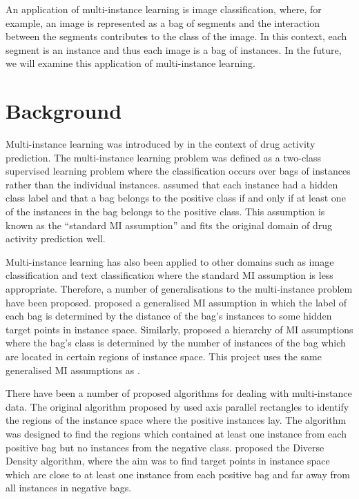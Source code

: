 \documentclass[a4paper,12pt]{article} %
\begin{document}
An application of multi-instance learning is image classification,
    where, for example, 
    an image is represented as a bag of segments and 
    the interaction between the segments contributes 
    to the class of the image. 
In this context, 
    each segment is an instance and 
    thus each image is a bag of instances. 
In the future, we will examine this application of multi-instance learning.

\section{Background}

Multi-instance learning was introduced by  
    in the context of drug activity prediction. 
The multi-instance learning problem was 
    defined as a two-class supervised learning problem where 
    the classification occurs over bags of instances 
    rather than the individual instances. 
 assumed that each instance had a hidden class label and 
    that a bag belongs to the positive class if and only if 
    at least one of the instances in the bag belongs to the positive class. 
This assumption is known as the ``standard MI assumption'' and 
    fits the original domain of drug activity prediction well.

Multi-instance learning has also been applied to other domains 
    such as image classification and text classification where 
    the standard MI assumption is less appropriate. 
Therefore, a number of generalisations to the multi-instance problem have been proposed.
 proposed a generalised MI assumption in which 
    the label of each bag is determined by the 
    distance of the bag's instances to some hidden target points in instance space.
Similarly,  proposed a hierarchy of MI assumptions where 
    the bag's class is determined by the number of instances 
    of the bag which are located in certain regions of instance space.
This project uses the same generalised MI assumptions as .

There have been a number of proposed algorithms 
    for dealing with multi-instance data. 
The original algorithm proposed by  
    used axis parallel rectangles to identify the regions of the instance space 
    where the positive instances lay. 
The algorithm was designed to find the regions which 
    contained at least one instance from each positive bag 
    but no instances from the negative class. 
 proposed the Diverse Density algorithm, 
    where the aim was to find target points in instance space 
    which are close to at least one instance from each positive bag and 
    far away from all instances in negative bags.
\end{document}

